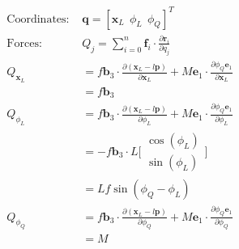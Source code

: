\documentclass[11pt]{article}
\begin{document}
\mbox{} \newline
\begin{align*}
\text{Coordinates: } & \mathbf{q} = [\mathbf{x}_L \ \ \phi_L\ \ \phi_Q]^T \\
\text{Forces: } & Q_j = \displaystyle\sum\limits_{i=0}^n \mathbf{f}_i \cdot \frac{ \partial \mathbf{r}_i} { \partial q_j} \\
Q_{\mathbf{x}_L} &= f \mathbf{b}_3 \cdot \frac{ \partial (\mathbf{x}_L - l \mathbf{p})} { \partial \mathbf{x}_L} +  M \mathbf{e}_1 \cdot \frac{ \partial \phi_Q \mathbf{e}_1} { \partial \mathbf{x}_L} \\
&= f \mathbf{b}_3 \\
Q_{\phi_L} &= f \mathbf{b}_3 \cdot \frac{ \partial (\mathbf{x}_L - l \mathbf{p})} { \partial \phi_L} +  M \mathbf{e}_1 \cdot \frac{ \partial \phi_Q \mathbf{e}_1} { \partial \phi_L} \\
&= - f \mathbf{b}_3 \cdot L 
\bigl [ \begin{smallmatrix}
\cos(\phi_L) \\ \sin(\phi_L)
\end{smallmatrix} \bigr ] \\
&= Lf \sin(\phi_Q - \phi_L) \\
Q_{\phi_Q} &= f \mathbf{b}_3 \cdot \frac{ \partial (\mathbf{x}_L - l \mathbf{p})} { \partial \phi_Q} +  M \mathbf{e}_1 \cdot \frac{ \partial \phi_Q \mathbf{e}_1} { \partial \phi_Q} \\
&= M
\end{align*}
\end{document}
